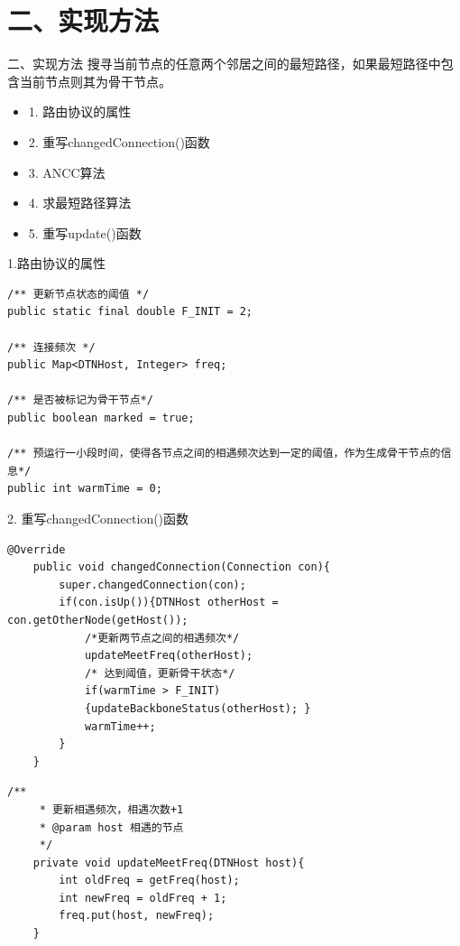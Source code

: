 \documentclass[12pt,aspectratio=43,table]{beamer}
\begin{document}
\section{二、实现方法}
\begin{frame}{二、实现方法}
搜寻当前节点的任意两个邻居之间的最短路径，如果最短路径中包含当前节点则其为骨干节点。
\begin{itemize}
\item  1. 路由协议的属性
\item  2. 重写changedConnection()函数
\item  3. ANCC算法
\item  4. 求最短路径算法
\item  5. 重写update()函数
\end{itemize}
\end{frame}

\begin{frame}[fragile]{\small1.路由协议的属性}
\begin{lstlisting}
/** 更新节点状态的阈值 */
public static final double F_INIT = 2;

/** 连接频次 */
public Map<DTNHost, Integer> freq;

/** 是否被标记为骨干节点*/
public boolean marked = true;

/** 预运行一小段时间，使得各节点之间的相遇频次达到一定的阈值，作为生成骨干节点的信息*/
public int warmTime = 0;
\end{lstlisting}
\end{frame}

\begin{frame}[fragile]{\small2. 重写changedConnection()函数}
\begin{lstlisting}
@Override
    public void changedConnection(Connection con){
        super.changedConnection(con);
        if(con.isUp()){DTNHost otherHost = con.getOtherNode(getHost());
            /*更新两节点之间的相遇频次*/
            updateMeetFreq(otherHost);
            /* 达到阈值，更新骨干状态*/
            if(warmTime > F_INIT)
            {updateBackboneStatus(otherHost); }
            warmTime++;
        }
    }
\end{lstlisting}
\end{frame}

\begin{frame}[fragile]
\begin{lstlisting}
/**
     * 更新相遇频次，相遇次数+1
     * @param host 相遇的节点
     */
    private void updateMeetFreq(DTNHost host){
        int oldFreq = getFreq(host);
        int newFreq = oldFreq + 1;
        freq.put(host, newFreq);
    }
\end{lstlisting}
\end{frame}
\end{document}

